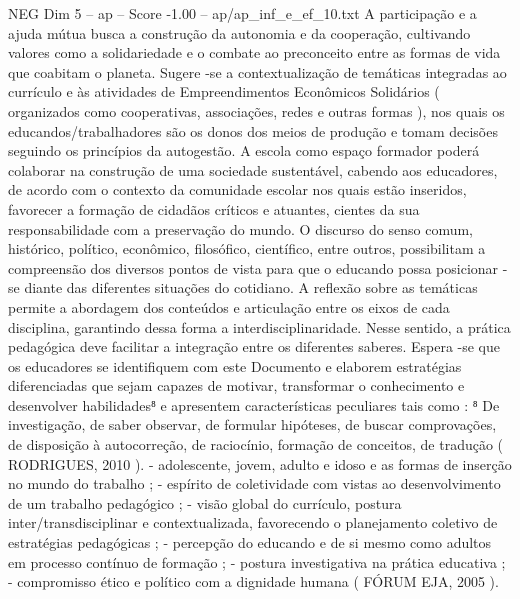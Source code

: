 \begin{textsample}{NEG Dim 5 – ap – Score -1.00 – ap/ap\_inf\_e\_ef\_10.txt}
A participação e a ajuda mútua busca a construção da autonomia e da cooperação, cultivando valores como a solidariedade e o combate ao preconceito entre as formas de vida que coabitam o planeta.
Sugere -se a contextualização de temáticas integradas ao currículo e às atividades de Empreendimentos Econômicos Solidários ( organizados como cooperativas, associações, redes e outras formas ), nos quais os educandos/trabalhadores são os donos dos meios de produção e tomam decisões seguindo os princípios da autogestão.
A escola como espaço formador poderá colaborar na construção de uma sociedade sustentável, cabendo aos educadores, de acordo com o contexto da comunidade escolar nos quais estão inseridos, favorecer a formação de cidadãos críticos e atuantes, cientes da sua responsabilidade com a preservação do mundo.
O discurso do senso comum, histórico, político, econômico, filosófico, científico, entre outros, possibilitam a compreensão dos diversos pontos de vista para que o educando possa posicionar -se diante das diferentes situações do cotidiano.
A reflexão sobre as temáticas permite a abordagem dos conteúdos e articulação entre os eixos de cada disciplina, garantindo dessa forma a interdisciplinaridade.
Nesse sentido, a prática pedagógica deve facilitar a integração entre os diferentes saberes.
Espera -se que os educadores se identifiquem com este Documento e elaborem estratégias diferenciadas que sejam capazes de motivar, transformar o conhecimento e desenvolver habilidades⁸ e apresentem características peculiares tais como : ⁸ De investigação, de saber observar, de formular hipóteses, de buscar comprovações, de disposição à autocorreção, de raciocínio, formação de conceitos, de tradução ( RODRIGUES, 2010 ). - adolescente, jovem, adulto e idoso e as formas de inserção no mundo do trabalho ; - espírito de coletividade com vistas ao desenvolvimento de um trabalho pedagógico ; - visão global do currículo, postura inter/transdisciplinar e contextualizada, favorecendo o planejamento coletivo de estratégias pedagógicas ; - percepção do educando e de si mesmo como adultos em processo contínuo de formação ; - postura investigativa na prática educativa ; - compromisso ético e político com a dignidade humana ( FÓRUM EJA, 2005 ).

\end{textsample}
